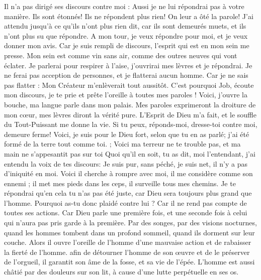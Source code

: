 \begin{multicols}{2}
Il n'a pas dirigé ses discours contre moi : Aussi je ne lui répondrai pas à votre manière.
Ils sont étonnés! Ils ne répondent plus rien! On leur a ôté la parole!
J'ai attendu jusqu'à ce qu'ils n'ont plus rien dit, car ils sont demeurés muets, et ils n'ont plus su que répondre.
A mon tour, je veux répondre pour moi, et je veux donner mon avis.
Car je suis rempli de discours, l'esprit qui est en mon sein me presse.
Mon sein est comme vin sans air, comme des outres neuves qui vont éclater.
Je parlerai pour respirer à l'aise, j'ouvrirai mes lèvres et je répondrai.
Je ne ferai pas acception de personnes, et je flatterai aucun homme.
Car je ne sais pas flatter : Mon Créateur m'enlèverait tout aussitôt.
\VerseOne{}C'est pourquoi Job, écoute mon discours, je te prie et prête l'oreille à toutes mes paroles !
Voici, j'ouvre la bouche, ma langue parle dans mon palais.
Mes paroles exprimeront la droiture de mon cœur, mes lèvres diront la vérité pure.
L'Esprit de Dieu m'a fait, et le souffle du Tout-Puissant me donne la vie.
Si tu peux, réponds-moi, dresse-toi contre moi, demeure ferme!
Voici, je suis pour le Dieu fort, selon que tu en as parlé; j'ai été formé de la terre tout comme toi. ;
Voici ma terreur ne te trouble pas, et ma main ne s'appesantit pas sur toi
Quoi qu'il en soit, tu as dit, moi l'entendant, j'ai entendu la voix de tes discours:
Je suis pur, sans péché, je suis net, il n'y a pas d'iniquité en moi.
Voici il cherche à rompre avec moi, il me considère comme son ennemi ;
il met mes pieds dans les ceps, il surveille tous mes chemins.
Je te répondrai qu'en cela tu n'as pas été juste, car Dieu sera toujours plus grand que l'homme.
Pourquoi as-tu donc plaidé contre lui ? Car il ne rend pas compte de toutes ses actions.
Car Dieu parle une première fois, et une seconde fois à celui qui n'aura pas pris garde à la première.
Par des songes, par des visions nocturnes, quand les hommes tombent dans un profond sommeil, quand ils dorment sur leur couche.
Alors il ouvre l'oreille de l'homme d'une mauvaise action et de rabaisser la fierté de l'homme.
afin de détourner l'homme de son œuvre et de le préserver de l'orgueil,
il garantit son âme de la fosse, et sa vie de l'épée.
L'homme est aussi châtié par des douleurs sur son lit, à cause d'une lutte perpétuelle en ses os.

\end{multicols}
